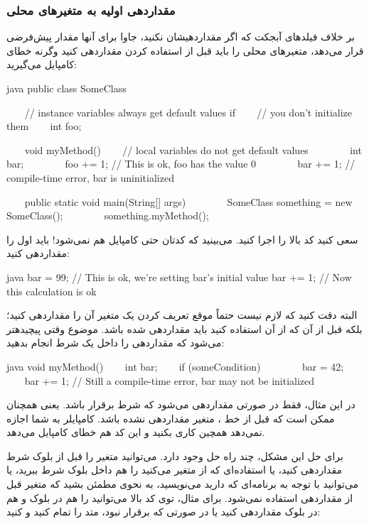 \subsubsection{مقداردهی اولیه به متغیرهای محلی}

بر خلاف فیلدهای آبجکت که اگر مقداردهیشان نکنید، جاوا برای آنها مقدار
پیش‌\-فرضی قرار می‌دهد، متغیرهای محلی را باید قبل از استفاده کردن مقداردهی
کنید وگرنه خطای کامپایل می\-‌گیرید:

\begin{codebox}{java}
public class SomeClass {
    // instance variables always get default values if  
    // you don't initialize them
    int foo;

    void myMethod() {
    // local variables do not get default values
        int bar;
        foo += 1; // This is ok, foo has the value 0
        bar += 1; // compile-time error, bar is uninitialized
    }

    public static void main(String[] args) {  
        SomeClass something = new SomeClass();  
        something.myMethod();  
    }  
}
\end{codebox}

سعی کنید کد بالا را اجرا کنید. می‌\-بینید که کدتان حتی کامپایل هم نمی‌شود!
باید اول  را مقداردهی کنید:

\begin{codebox}{java}
bar = 99; // This is ok, we're setting bar's initial value  
bar += 1; // Now this calculation is ok
\end{codebox}

البته دقت کنید که لازم نیست حتماً موقع تعریف کردن یک متغیر آن را مقداردهی
کنید؛ بلکه قبل از آن که از آن استفاده کنید باید مقداردهی شده باشد. موضوع
وقتی پیچیده\-تر می‌شود که مقداردهی را داخل یک شرط انجام بدهید:

\begin{codebox}{java}
void myMethod() {
    int bar;
    if (someCondition) {  
        bar = 42;  
    }  
    bar += 1; // Still a compile-time error, bar may not be initialized
}
\end{codebox}

در این مثال،  فقط در صورتی مقداردهی می‌شود که شرط
 برقرار باشد. یعنی همچنان ممکن است که قبل از
خط  ، متغیر  مقداردهی نشده باشد.
کامپایلر به شما اجازه نمی‌دهد همچین کاری بکنید و این کد هم خطای کامپایل
می‌دهد.

برای حل این مشکل، چند راه حل وجود دارد. می\-‌توانید متغیر را قبل از بلوک
شرط مقداردهی کنید، یا استفاده‌ای که از متغیر می‌\-کنید را هم داخل بلوک شرط
ببرید، یا می‌\-توانید با توجه به برنامه\-‌ای که دارید می‌\-نویسید، به نحوی
مطمئن بشید که متغیر قبل از مقداردهی استفاده نمی‌شود. برای مثال، توی کد
بالا می‌\-توانید  را هم در بلوک  و هم در بلوک
 مقداردهی کنید یا در صورتی که
 برقرار نبود، متد را تمام کنید و
 کنید:

